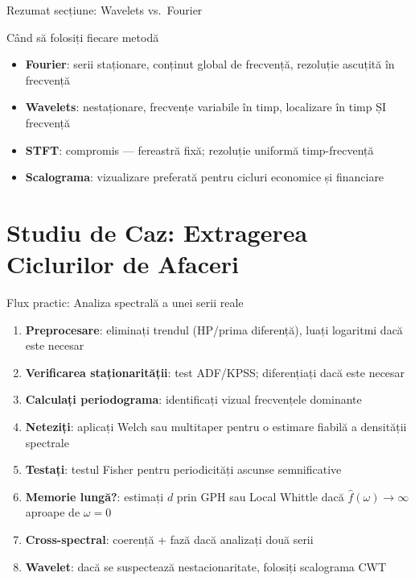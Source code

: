 \documentclass[9pt, aspectratio=169, t]{beamer}
\begin{document}
\begin{frame}{Rezumat secțiune: Wavelets vs.\ Fourier}
\begin{block}{Când să folosiți fiecare metodă}
\begin{itemize}\setlength{\itemsep}{2pt}
    \item \textbf{Fourier}: serii staționare, conținut global de frecvență, rezoluție ascuțită în frecvență
    \item \textbf{Wavelets}: nestaționare, frecvențe variabile în timp, localizare în timp ȘI frecvență
    \item \textbf{STFT}: compromis --- fereastră fixă; rezoluție uniformă timp-frecvență
    \item \textbf{Scalograma}: vizualizare preferată pentru cicluri economice și financiare
\end{itemize}
\end{block}
\end{frame}

\section{Studiu de Caz: Extragerea Ciclurilor de Afaceri}

\begin{frame}{Flux practic: Analiza spectrală a unei serii reale}
\begin{enumerate}\setlength{\itemsep}{3pt}
    \item \textbf{Preprocesare}: eliminați trendul (HP/prima diferență), luați logaritmi dacă este necesar
    \item \textbf{Verificarea staționarității}: test ADF/KPSS; diferențiați dacă este necesar
    \item \textbf{Calculați periodograma}: identificați vizual frecvențele dominante
    \item \textbf{Neteziți}: aplicați Welch sau multitaper pentru o estimare fiabilă a densității spectrale
    \item \textbf{Testați}: testul Fisher pentru periodicități ascunse semnificative
    \item \textbf{Memorie lungă?}: estimați $d$ prin GPH sau Local Whittle dacă $\hat{f}(\omega) \to \infty$ aproape de $\omega=0$
    \item \textbf{Cross-spectral}: coerență + fază dacă analizați două serii
    \item \textbf{Wavelet}: dacă se suspectează nestacionaritate, folosiți scalograma CWT
\end{enumerate}
\end{frame}
\end{document}
